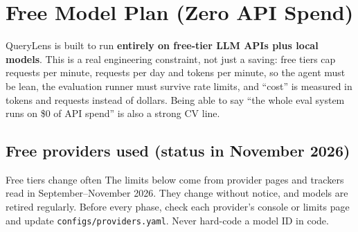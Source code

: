 \documentclass[11pt,a4paper]{article}
\newcommand{\code}[1]{\texttt{\small #1}}
\begin{document}
\section{Free Model Plan (Zero API Spend)}

QueryLens is built to run \textbf{entirely on free-tier LLM APIs plus local models}. This is a
real engineering constraint, not just a saving: free tiers cap requests per minute, requests per
day and tokens per minute, so the agent must be lean, the evaluation runner must survive rate
limits, and ``cost'' is measured in tokens and requests instead of dollars. Being able to say
``the whole eval system runs on \$0 of API spend'' is also a strong CV line.

\subsection{Free providers used (status in November 2026)}

\begin{warnbox}{Free tiers change often}
The limits below come from provider pages and trackers read in September--November 2026. They
change without notice, and models are retired regularly. Before every phase, check each
provider's console or limits page and update \code{configs/providers.yaml}. Never hard-code a
model ID in code.
\end{warnbox}
\end{document}
